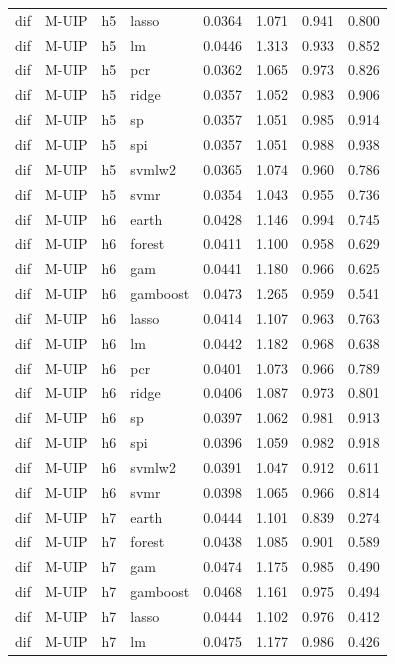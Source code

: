 \begin{ThreePartTable}
\begin{longtable}[t]{llclcccc}
dif & M-UIP & h5 & lasso & 0.0364 & 1.071 & 0.941 & 0.800\\
dif & M-UIP & h5 & lm & 0.0446 & 1.313 & 0.933 & 0.852\\
dif & M-UIP & h5 & pcr & 0.0362 & 1.065 & 0.973 & 0.826\\
dif & M-UIP & h5 & ridge & 0.0357 & 1.052 & 0.983 & 0.906\\
dif & M-UIP & h5 & sp & 0.0357 & 1.051 & 0.985 & 0.914\\
dif & M-UIP & h5 & spi & 0.0357 & 1.051 & 0.988 & 0.938\\
dif & M-UIP & h5 & svmlw2 & 0.0365 & 1.074 & 0.960 & 0.786\\
dif & M-UIP & h5 & svmr & 0.0354 & 1.043 & 0.955 & 0.736\\
\addlinespace
dif & M-UIP & h6 & earth & 0.0428 & 1.146 & 0.994 & 0.745\\
dif & M-UIP & h6 & forest & 0.0411 & 1.100 & 0.958 & 0.629\\
dif & M-UIP & h6 & gam & 0.0441 & 1.180 & 0.966 & 0.625\\
dif & M-UIP & h6 & gamboost & 0.0473 & 1.265 & 0.959 & 0.541\\
dif & M-UIP & h6 & lasso & 0.0414 & 1.107 & 0.963 & 0.763\\
dif & M-UIP & h6 & lm & 0.0442 & 1.182 & 0.968 & 0.638\\
dif & M-UIP & h6 & pcr & 0.0401 & 1.073 & 0.966 & 0.789\\
dif & M-UIP & h6 & ridge & 0.0406 & 1.087 & 0.973 & 0.801\\
dif & M-UIP & h6 & sp & 0.0397 & 1.062 & 0.981 & 0.913\\
dif & M-UIP & h6 & spi & 0.0396 & 1.059 & 0.982 & 0.918\\
dif & M-UIP & h6 & svmlw2 & 0.0391 & 1.047 & 0.912 & 0.611\\
dif & M-UIP & h6 & svmr & 0.0398 & 1.065 & 0.966 & 0.814\\
\addlinespace
dif & M-UIP & h7 & earth & 0.0444 & 1.101 & 0.839 & 0.274\\
dif & M-UIP & h7 & forest & 0.0438 & 1.085 & 0.901 & 0.589\\
dif & M-UIP & h7 & gam & 0.0474 & 1.175 & 0.985 & 0.490\\
dif & M-UIP & h7 & gamboost & 0.0468 & 1.161 & 0.975 & 0.494\\
dif & M-UIP & h7 & lasso & 0.0444 & 1.102 & 0.976 & 0.412\\
dif & M-UIP & h7 & lm & 0.0475 & 1.177 & 0.986 & 0.426\\

\end{longtable}
\end{ThreePartTable}
